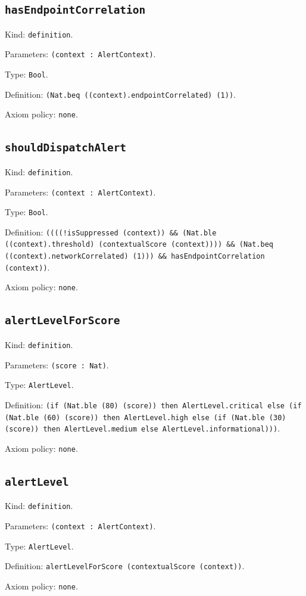 \documentclass[11pt]{article}
\begin{document}
\subsection*{\texttt{hasEndpointCorrelation}}
\noindent Kind: \texttt{definition}.\par
\noindent Parameters: \texttt{(context : AlertContext)}.\par
\noindent Type: \texttt{Bool}.\par
\noindent Definition: \texttt{(Nat.beq ((context).endpointCorrelated) (1))}.\par
\noindent Axiom policy: \texttt{none}.\par
\subsection*{\texttt{shouldDispatchAlert}}
\noindent Kind: \texttt{definition}.\par
\noindent Parameters: \texttt{(context : AlertContext)}.\par
\noindent Type: \texttt{Bool}.\par
\noindent Definition: \texttt{((((!isSuppressed (context)) \&\& (Nat.ble ((context).threshold) (contextualScore (context)))) \&\& (Nat.beq ((context).networkCorrelated) (1))) \&\& hasEndpointCorrelation (context))}.\par
\noindent Axiom policy: \texttt{none}.\par
\subsection*{\texttt{alertLevelForScore}}
\noindent Kind: \texttt{definition}.\par
\noindent Parameters: \texttt{(score : Nat)}.\par
\noindent Type: \texttt{AlertLevel}.\par
\noindent Definition: \texttt{(if (Nat.ble (80) (score)) then AlertLevel.critical else (if (Nat.ble (60) (score)) then AlertLevel.high else (if (Nat.ble (30) (score)) then AlertLevel.medium else AlertLevel.informational)))}.\par
\noindent Axiom policy: \texttt{none}.\par
\subsection*{\texttt{alertLevel}}
\noindent Kind: \texttt{definition}.\par
\noindent Parameters: \texttt{(context : AlertContext)}.\par
\noindent Type: \texttt{AlertLevel}.\par
\noindent Definition: \texttt{alertLevelForScore (contextualScore (context))}.\par
\noindent Axiom policy: \texttt{none}.\par
\end{document}
